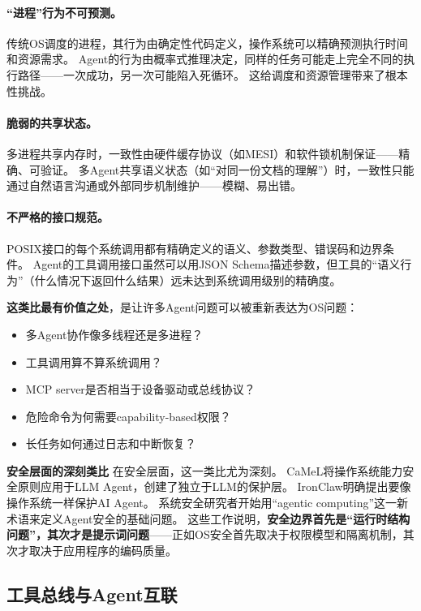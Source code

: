 \paragraph{``进程''行为不可预测。}
传统OS调度的进程，其行为由确定性代码定义，操作系统可以精确预测执行时间和资源需求。
Agent的行为由概率式推理决定，同样的任务可能走上完全不同的执行路径——一次成功，另一次可能陷入死循环。
这给调度和资源管理带来了根本性挑战。

\paragraph{脆弱的共享状态。}
多进程共享内存时，一致性由硬件缓存协议（如MESI）和软件锁机制保证——精确、可验证。
多Agent共享语义状态（如``对同一份文档的理解''）时，一致性只能通过自然语言沟通或外部同步机制维护——模糊、易出错。

\paragraph{不严格的接口规范。}
POSIX接口的每个系统调用都有精确定义的语义、参数类型、错误码和边界条件。
Agent的工具调用接口虽然可以用JSON Schema描述参数，但工具的``语义行为''（什么情况下返回什么结果）远未达到系统调用级别的精确度。

\textbf{这类比最有价值之处}，是让许多Agent问题可以被重新表达为OS问题：
\begin{itemize}[nosep]
\item 多Agent协作像多线程还是多进程？\cite{wu2023autogen}
\item 工具调用算不算系统调用？
\item MCP server是否相当于设备驱动或总线协议？\cite{mcp_intro_2026}
\item 危险命令为何需要capability-based权限？\cite{debenedetti2025camel}
\item 长任务如何通过日志和中断恢复？\cite{openai_codex_approvals_2026}
\end{itemize}

\textbf{安全层面的深刻类比}
在安全层面，这一类比尤为深刻。
CaMeL将操作系统能力安全原则应用于LLM Agent，创建了独立于LLM的保护层\cite{debenedetti2025camel}。
IronClaw明确提出要像操作系统一样保护AI Agent\cite{ironclaw2025}。
系统安全研究者开始用``agentic computing''这一新术语来定义Agent安全的基础问题\cite{agenticsecurity2025}。
这些工作说明，\textbf{安全边界首先是``运行时结构问题''，其次才是提示词问题}——正如OS安全首先取决于权限模型和隔离机制，其次才取决于应用程序的编码质量。

\subsection{工具总线与Agent互联}
\label{sec:io}

